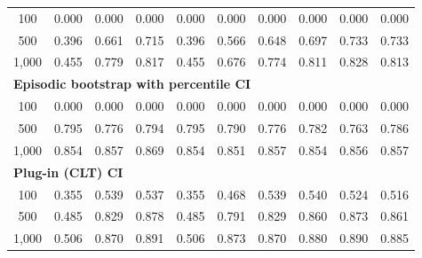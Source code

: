 \documentclass{article}
\numberwithin{equation}{section}
\begin{document}
\begin{table}[ht]
\begin{tabular}{c|ccc|cccccc}
100
& 0.000 & 0.000 & 0.000
& 0.000 & 0.000 & 0.000 & 0.000 & 0.000 & 0.000 \\
500
& 0.396 & 0.661 & \cellcolor{covheat!8!white}0.715
& 0.396 & 0.566 & 0.648 & 0.697 & \cellcolor{covheat!17!white}0.733 & \cellcolor{covheat!17!white}0.733 \\
1{,}000
& 0.455 & \cellcolor{covheat!40!white}0.779 & \cellcolor{covheat!58!white}0.817
& 0.455 & 0.676 & \cellcolor{covheat!37!white}0.774 & \cellcolor{covheat!56!white}0.811 & \cellcolor{covheat!64!white}0.828 & \cellcolor{covheat!56!white}0.813 \\
\hline
\multicolumn{10}{l}{\textbf{Episodic bootstrap with percentile CI}} \\ \hline
100
& 0.000 & 0.000 & 0.000
& 0.000 & 0.000 & 0.000 & 0.000 & 0.000 & 0.000 \\
500
& \cellcolor{covheat!48!white}0.795 & \cellcolor{covheat!38!white}0.776 & \cellcolor{covheat!47!white}0.794
& \cellcolor{covheat!48!white}0.795 & \cellcolor{covheat!45!white}0.790 & \cellcolor{covheat!38!white}0.776 & \cellcolor{covheat!41!white}0.782 & \cellcolor{covheat!32!white}0.763 & \cellcolor{covheat!43!white}0.786 \\
1{,}000
& \cellcolor{covheat!77!white}0.854 & \cellcolor{covheat!78!white}0.857 & \cellcolor{covheat!84!white}0.869
& \cellcolor{covheat!77!white}0.854 & \cellcolor{covheat!75!white}0.851 & \cellcolor{covheat!78!white}0.857 & \cellcolor{covheat!77!white}0.854 & \cellcolor{covheat!78!white}0.856 & \cellcolor{covheat!78!white}0.857 \\
\hline
\multicolumn{10}{l}{\textbf{Plug-in (CLT) CI}} \\ \hline
100
& 0.355 & 0.539 & 0.537
& 0.355 & 0.468 & 0.539 & 0.540 & 0.524 & 0.516 \\
500
& 0.485 & \cellcolor{covheat!64!white}0.829 & \cellcolor{covheat!89!white}0.878
& 0.485 & \cellcolor{covheat!46!white}0.791 & \cellcolor{covheat!64!white}0.829 & \cellcolor{covheat!80!white}0.860 & \cellcolor{covheat!86!white}0.873 & \cellcolor{covheat!80!white}0.861 \\
1{,}000
& 0.506 & \cellcolor{covheat!85!white}0.870 & \cellcolor{covheat!96!white}0.891
& 0.506 & \cellcolor{covheat!86!white}0.873 & \cellcolor{covheat!85!white}0.870 & \cellcolor{covheat!90!white}0.880 & \cellcolor{covheat!95!white}0.890 & \cellcolor{covheat!92!white}0.885 \\
\hline
\end{tabular}
\end{table}

\clearpage
\clearpage
\end{document}

